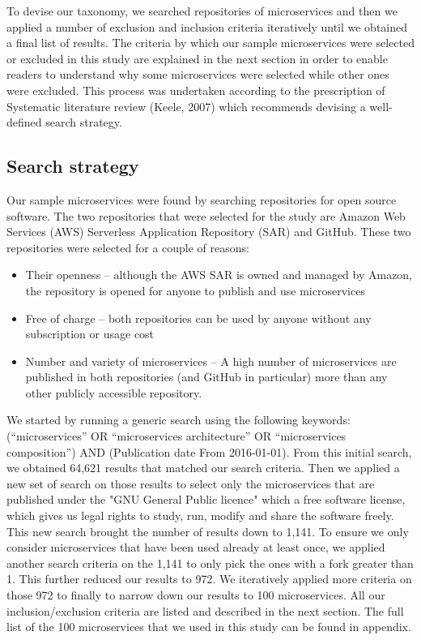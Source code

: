 \documentclass{article}
\begin{document}
To devise our taxonomy, we searched repositories of microservices and then we applied a number of exclusion and inclusion criteria iteratively until we obtained a final list of results. The criteria by which our sample microservices were selected or excluded in this study are explained in the next section in order to enable readers to understand why some microservices were selected while other ones were excluded. This process was undertaken according to the prescription of Systematic literature review (Keele, 2007) which recommends devising a well-defined search strategy.


\subsection{Search strategy}


Our sample microservices were found by searching repositories for open source software. The two repositories that were selected for the study are Amazon Web Services (AWS) Serverless Application Repository (SAR) and GitHub. These two repositories were selected for a couple of reasons:

\begin{itemize} 


\item Their openness – although the AWS SAR is owned and managed by Amazon, the repository is opened for anyone to publish and use microservices 
\item Free of charge – both repositories can be used by anyone without any subscription or usage cost
\item Number and variety of microservices – A high number of microservices are published in both repositories (and GitHub in particular) more than any other publicly accessible repository. 

\end{itemize}


We started by running a generic search using the following keywords: (“microservices” OR “microservices architecture” OR “microservices composition”) AND (Publication date From 2016-01-01). From this initial search, we obtained 64,621 results that matched our search criteria. Then we applied a new set of search on those results to select only the microservices that are published under the "GNU General Public licence" which a free software license, which gives us legal rights to study, run, modify and share the software freely. This new search brought the number of results down to 1,141. To ensure we only consider microservices that have been used already at least once, we applied another search criteria on the 1,141 to only pick the ones with a fork greater than 1. This further reduced our results to 972. We iteratively applied more criteria on those 972 to finally to narrow down our results to 100 microservices. All our inclusion/exclusion criteria are listed and described in the next section. The full list of the 100 microservices that we used in this study can be found in appendix. 
\end{document}
